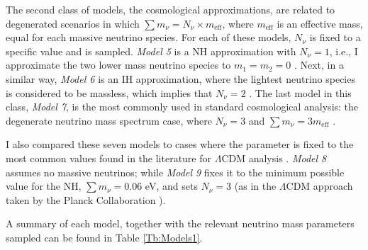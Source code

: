 \qquad The second class of models, the cosmological approximations, are related to degenerated scenarios in which $\sum m_{\nu} = N_{\nu}\times m_{\text{eff}}$, where $m_{\text{eff}}$ is an effective mass, equal for each massive neutrino species. For each of these models, $N_{\nu}$ is fixed to a specific value and \NM{} is sampled. \textit{Model 5} is a NH approximation with $N_{\nu} = 1$, i.e., I approximate the two lower mass neutrino species to $m_1 = m_2 = 0$ \citep[][ -- also used in Chapter \ref{Chap:BOSS}]{2003HannestadNeutrino,2014Battye-Deg-1Mass,2016Giusarma-Deg-InvApp-NormAppr,PlanckCosmology2016,2018LoureiroBOSS}. Next, in a similar way, \textit{Model 6} is an IH approximation, where the lightest neutrino species is considered to be massless, which implies that $N_{\nu} = 2$ \citep{2016Giusarma-Deg-InvApp-NormAppr}. The last model in this class, \textit{Model 7}, is the most commonly used in standard cosmological analysis: the degenerate neutrino mass spectrum case, where $N_{\nu} = 3$ and $\sum m_{\nu} = 3m_{\text{eff}}$ \citep{2012Julien-Deg,2013Giusarma-Deg,2014Battye-Deg-1Mass,2015LyAlpha-Deg,2016Cuesta-Deg,2016BOSSCosmology,2016Giusarma-Deg-InvApp-NormAppr,2017Achidiacono-Deg,2017Cuchout-DegCase,2018PlanckCosmology,2017Vagnozzi-3deg,2018UpdateNeutrinoMass}. 

\qquad I also compared these seven models to cases where the \NM{} parameter is fixed to the most common values found in the literature for $\Lambda$CDM analysis \citep{2017arXiv170801530D,2017MNRAS.465.1454H,2018PlanckCosmology,2016BOSSCosmology}. \textit{Model 8} assumes no massive neutrinos; while \textit{Model 9} fixes it to the minimum possible value for the NH, $\sum m_{\nu} = 0.06$ eV, and sets $N_{\nu} = 3$ (as in the $\Lambda$CDM approach taken by the Planck Collaboration \citep{PlanckCosmology2016,PlanckResults2015}).

\qquad A summary of each model, together with the relevant neutrino mass parameters sampled %
can be found in Table \ref{Tb:Models1}.

